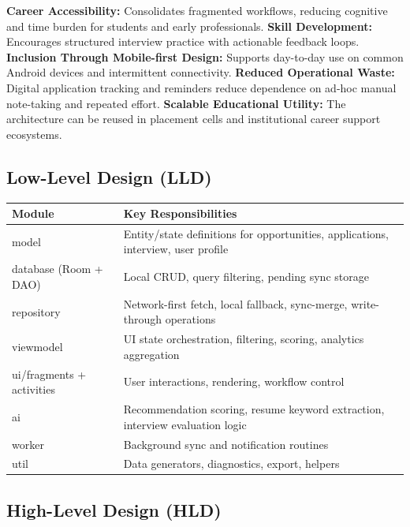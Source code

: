 \documentclass[conference]{IEEEtran}
\begin{document}
\textbf{Career Accessibility:} Consolidates fragmented workflows, reducing cognitive and time burden for students and early professionals. \textbf{Skill Development:} Encourages structured interview practice with actionable feedback loops. \textbf{Inclusion Through Mobile-first Design:} Supports day-to-day use on common Android devices and intermittent connectivity. \textbf{Reduced Operational Waste:} Digital application tracking and reminders reduce dependence on ad-hoc manual note-taking and repeated effort. \textbf{Scalable Educational Utility:} The architecture can be reused in placement cells and institutional career support ecosystems.

\subsection{Low-Level Design (LLD)}

\begin{table}[!tb]
\centering
\setlength{\tabcolsep}{4pt}
\normalsize
\begin{tabularx}{\textwidth}{|>{\RaggedRight\arraybackslash}X|>{\RaggedRight\arraybackslash}X|}
\hline
 \textbf{Module} & \textbf{Key Responsibilities} \\
\hline
 model & Entity/state definitions for opportunities, applications, interview, user profile \\
\hline
 database (Room + DAO) & Local CRUD, query filtering, pending sync storage \\
\hline
 repository & Network-first fetch, local fallback, sync-merge, write-through operations \\
\hline
 viewmodel & UI state orchestration, filtering, scoring, analytics aggregation \\
\hline
 ui/fragments + activities & User interactions, rendering, workflow control \\
\hline
 ai & Recommendation scoring, resume keyword extraction, interview evaluation logic \\
\hline
 worker & Background sync and notification routines \\
\hline
 util & Data generators, diagnostics, export, helpers \\
\hline
\end{tabularx}
\end{table}

\subsection{High-Level Design (HLD)}
\end{document}
